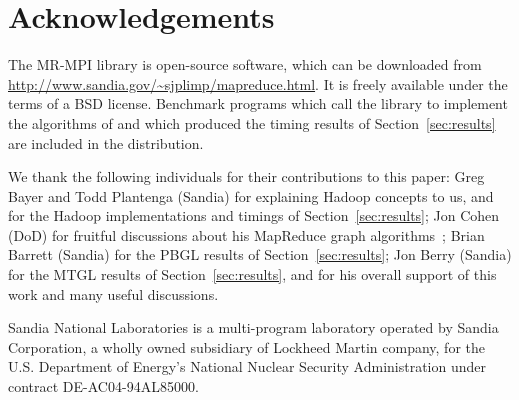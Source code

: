\section{Acknowledgements}
\label{sec:thanks}

The MR-MPI library is open-source software, which can be downloaded
from \url{http://www.sandia.gov/~sjplimp/mapreduce.html}.  It is
freely available under the terms of a BSD license.  Benchmark programs
which call the library to implement the algorithms of and which
produced the timing results of Section~\ref{sec:results} are included
in the distribution.

We thank the following individuals for their contributions to this
paper: Greg Bayer and Todd Plantenga (Sandia) for explaining Hadoop
concepts to us, and for the Hadoop implementations and timings of
Section~\ref{sec:results}; Jon Cohen (DoD) for fruitful discussions
about his MapReduce graph algorithms~\cite{Cohen09}; Brian Barrett
(Sandia) for the PBGL results of Section~\ref{sec:results}; Jon Berry
(Sandia) for the MTGL results of Section~\ref{sec:results}, and for
his overall support of this work and many useful discussions.

Sandia National Laboratories is a multi-program laboratory operated by
Sandia Corporation, a wholly owned subsidiary of Lockheed Martin
company, for the U.S. Department of Energy's National Nuclear Security
Administration under contract DE-AC04-94AL85000.
